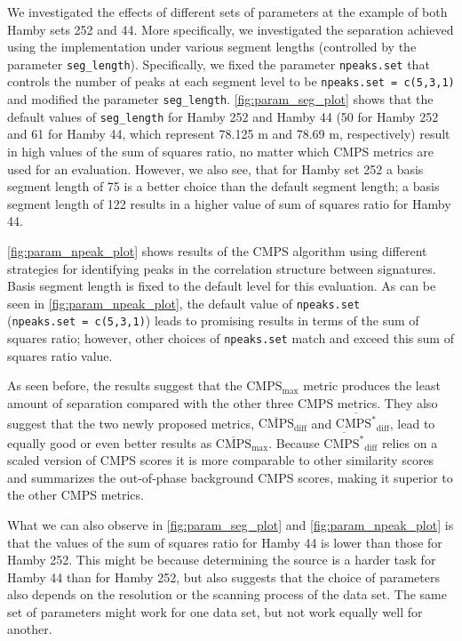We investigated the effects of different sets of parameters at the
example of both Hamby sets 252 and 44. More specifically, we
investigated the separation achieved using the 
implementation under various segment lengths (controlled by the
parameter \texttt{seg\_length}). Specifically, we fixed the parameter
\texttt{npeaks.set} that controls the number of peaks at each segment
level to be \texttt{npeaks.set\ =\ c(5,3,1)} and modified the parameter
\texttt{seg\_length}. \autoref{fig:param_seg_plot} shows that the
default values of \texttt{seg\_length} for Hamby 252 and Hamby 44 (50
for Hamby 252 and 61 for Hamby 44, which represent 78.125 \textmu m and
78.69 \textmu m, respectively) result in high values of the sum of
squares ratio, no matter which CMPS metrics are used for an evaluation.
However, we also see, that for Hamby set 252 a basis segment length of
75 is a better choice than the default segment length; a basis segment
length of 122 results in a higher value of sum of squares ratio for
Hamby 44.

\autoref{fig:param_npeak_plot} shows results of the CMPS algorithm using
different strategies for identifying peaks in the correlation structure
between signatures. Basis segment length is fixed to the default level
for this evaluation. As can be seen in \autoref{fig:param_npeak_plot},
the default value of \texttt{npeaks.set}
(\texttt{npeaks.set\ =\ c(5,3,1)}) leads to promising results in terms
of the sum of squares ratio; however, other choices of
\texttt{npeaks.set} match and exceed this sum of squares ratio value.

As seen before, the results suggest that the \(\mathrm{CMPS_{max}}\)
metric produces the least amount of separation compared with the other
three CMPS metrics. They also suggest that the two newly proposed
metrics, \(\mathrm{\overline{CMPS}_{diff}}\) and
\(\mathrm{\overline{CMPS^*}_{diff}}\), lead to equally good or even
better results as \(\mathrm{\overline{CMPS}_{max}}\). Because
\(\mathrm{\overline{CMPS^*}_{diff}}\) relies on a scaled version of CMPS
scores it is more comparable to other similarity scores and summarizes
the out-of-phase background CMPS scores, making it superior to the other
CMPS metrics.

What we can also observe in \autoref{fig:param_seg_plot} and
\autoref{fig:param_npeak_plot} is that the values of the sum of squares
ratio for Hamby 44 is lower than those for Hamby 252. This might be
because determining the source is a harder task for Hamby 44 than for
Hamby 252, but also suggests that the choice of parameters also depends
on the resolution or the scanning process of the data set. The same set
of parameters might work for one data set, but not work equally well for
another.

